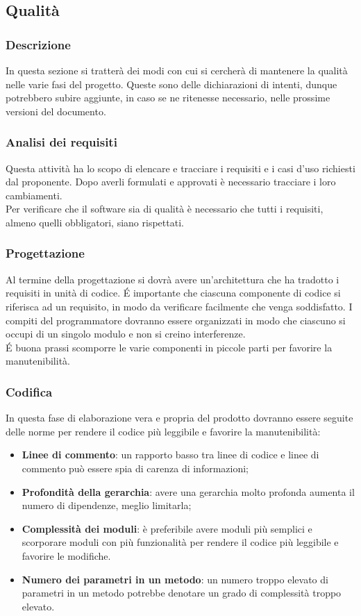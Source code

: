 \subsection{Qualità}
\subsubsection{Descrizione}
In questa sezione si tratterà dei modi con cui si cercherà di mantenere la qualità nelle varie fasi del progetto. Queste sono delle dichiarazioni di intenti, dunque potrebbero subire aggiunte, in caso se ne ritenesse necessario, nelle prossime versioni del documento.
\subsubsection{Analisi dei requisiti}
Questa attività ha lo scopo di elencare e tracciare i requisiti e i casi d'uso richiesti dal proponente. Dopo averli formulati e approvati è necessario tracciare i loro cambiamenti. \\
Per verificare che il software sia di qualità è necessario che tutti i requisiti, almeno quelli obbligatori, siano rispettati.
\subsubsection{Progettazione}
Al termine della progettazione si dovrà avere un'architettura che ha tradotto i requisiti in unità di codice. \'E importante che ciascuna componente di codice si riferisca ad un requisito, in modo da verificare facilmente che venga soddisfatto. I compiti del programmatore dovranno essere organizzati in modo che ciascuno si occupi di un singolo modulo e non si creino interferenze.\\
\'E buona prassi scomporre le varie componenti in piccole parti per favorire la manutenibilità. 
\subsubsection{Codifica}
In questa fase di elaborazione vera e propria del prodotto dovranno essere seguite delle norme per rendere il codice più leggibile e favorire la manutenibilità:
\begin{itemize}
\item \textbf{Linee di commento}: un rapporto basso tra linee di codice e linee di commento può essere spia di carenza di informazioni;
\item \textbf{Profondità della gerarchia}: avere una gerarchia molto profonda aumenta il numero di dipendenze, meglio limitarla;
\item \textbf{Complessità dei moduli}: è preferibile avere moduli più semplici e scorporare moduli con più funzionalità per rendere il codice più leggibile e favorire le modifiche. 
\item \textbf{Numero dei parametri in un metodo}: un numero troppo elevato di parametri in un metodo potrebbe denotare un grado di complessità troppo elevato.
\end{itemize}